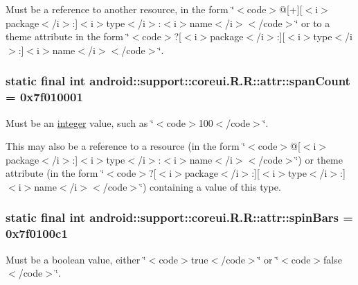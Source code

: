 Must be a reference to another resource, in the form \char`\"{}$<$code$>$@\mbox{[}+\mbox{]}\mbox{[}$<$i$>$package$<$/i$>$:\mbox{]}$<$i$>$type$<$/i$>$:$<$i$>$name$<$/i$>$$<$/code$>$\char`\"{} or to a theme attribute in the form \char`\"{}$<$code$>$?\mbox{[}$<$i$>$package$<$/i$>$:\mbox{]}\mbox{[}$<$i$>$type$<$/i$>$:\mbox{]}$<$i$>$name$<$/i$>$$<$/code$>$\char`\"{}. \hypertarget{classandroid_1_1support_1_1coreui_1_1_r_1_1attr_8d61d2bb1fd55729ba40cce3e8eda810}{
\subsubsection[{spanCount}]{\setlength{\rightskip}{0pt plus 5cm}static final int android::support::coreui.R.R::attr::spanCount = 0x7f010001}}
\label{classandroid_1_1support_1_1coreui_1_1_r_1_1attr_8d61d2bb1fd55729ba40cce3e8eda810}


Must be an \hyperlink{classandroid_1_1support_1_1coreui_1_1_r_1_1integer}{integer} value, such as \char`\"{}$<$code$>$100$<$/code$>$\char`\"{}. 

This may also be a reference to a resource (in the form \char`\"{}$<$code$>$@\mbox{[}$<$i$>$package$<$/i$>$:\mbox{]}$<$i$>$type$<$/i$>$:$<$i$>$name$<$/i$>$$<$/code$>$\char`\"{}) or theme attribute (in the form \char`\"{}$<$code$>$?\mbox{[}$<$i$>$package$<$/i$>$:\mbox{]}\mbox{[}$<$i$>$type$<$/i$>$:\mbox{]}$<$i$>$name$<$/i$>$$<$/code$>$\char`\"{}) containing a value of this type. \hypertarget{classandroid_1_1support_1_1coreui_1_1_r_1_1attr_06f531a648a240ee87e8248b92c65a02}{
\subsubsection[{spinBars}]{\setlength{\rightskip}{0pt plus 5cm}static final int android::support::coreui.R.R::attr::spinBars = 0x7f0100c1}}
\label{classandroid_1_1support_1_1coreui_1_1_r_1_1attr_06f531a648a240ee87e8248b92c65a02}


Must be a boolean value, either \char`\"{}$<$code$>$true$<$/code$>$\char`\"{} or \char`\"{}$<$code$>$false$<$/code$>$\char`\"{}. 

